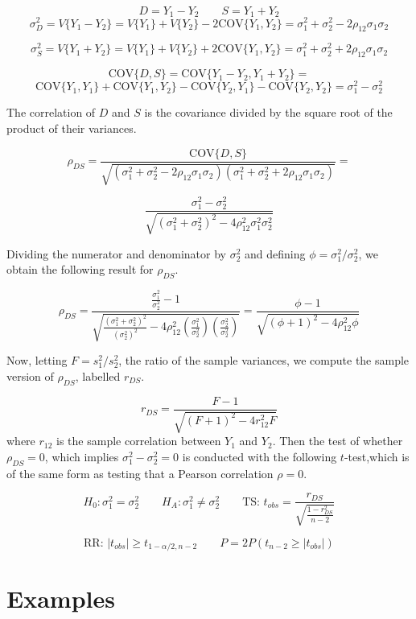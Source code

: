 \documentclass[
]{book}
\begin{document}
\[D=Y_1-Y_2 \qquad  S=Y_1+Y_2\]
\[\sigma_D^2 = V\{Y_1-Y_2\}=V\{Y_1\}+V\{Y_2\}-2\mbox{COV}\{Y_1,Y_2\}=
\sigma_1^2+\sigma_2^2-2\rho_{12}\sigma_1\sigma_2\]

\[\sigma_S^2 = V\{Y_1+Y_2\}=V\{Y_1\}+V\{Y_2\}+2\mbox{COV}\{Y_1,Y_2\}=
\sigma_1^2+\sigma_2^2+2\rho_{12}\sigma_1\sigma_2\]

\[\mbox{COV}\{D,S\}=\mbox{COV}\{Y_1-Y_2,Y_1+Y_2\}=\]
\[\mbox{COV}\{Y_1,Y_1\}+\mbox{COV}\{Y_1,Y_2\}-\mbox{COV}\{Y_2,Y_1\}-
\mbox{COV}\{Y_2,Y_2\}=\sigma_1^2-\sigma_2^2\]

The correlation of \(D\) and \(S\) is the covariance divided by the
square root of the product of their variances.

\[\rho_{DS}=
\frac{\mbox{COV}\{D,S\}}{
\sqrt{\left(\sigma_1^2+\sigma_2^2-2\rho_{12}\sigma_1\sigma_2\right)
\left(\sigma_1^2+\sigma_2^2+2\rho_{12}\sigma_1\sigma_2\right)}}=
\]

\[
\frac{\sigma_1^2-\sigma_2^2}{
\sqrt{\left(\sigma_1^2+\sigma_2^2\right)^2-
4\rho_{12}^2\sigma_1^2\sigma_2^2}}
\]

Dividing the numerator and denominator by \(\sigma_2^2\) and defining
\(\phi=\sigma_1^2/\sigma_2^2\), we obtain the following result for
\(\rho_{DS}\).

\[\rho_{DS}=\frac{\frac{\sigma_1^2}{\sigma_2^2}-1}{
\sqrt{\frac{\left(\sigma_1^2+\sigma_2^2\right)^2}{\left(\sigma_2^2\right)^2}-4\rho_{12}^2\left(\frac{\sigma_1^2}{\sigma_2^2}\right)
\left(\frac{\sigma_2^2}{\sigma_2^2}\right)}}=
\frac{\phi-1}{
\sqrt{(\phi+1)^2-4\rho_{12}^2\phi}
}
\]

Now, letting \(F=s_1^2/s_2^2\), the ratio of the sample variances, we
compute the sample version of \(\rho_{DS}\), labelled \(r_{DS}\).

\[r_{DS}=\frac{F-1}{\sqrt{(F+1)^2-4r_{12}^2F}}\] where \(r_{12}\) is the
sample correlation between \(Y_1\) and \(Y_2\). Then the test of whether
\(\rho_{DS}=0\), which implies \(\sigma_1^2-\sigma_2^2=0\) is conducted
with the following \(t\)-test,which is of the same form as testing that
a Pearson correlation \(\rho=0\).

\[H_0:\sigma_1^2=\sigma_2^2 \qquad H_A:\sigma_1^2 \neq \sigma_2^2 \qquad
\mbox{TS: } t_{obs}=\frac{r_{DS}}{\sqrt{\frac{1-r_{DS}^2}{n-2}}}\]

\[ \mbox{RR: } |t_{obs}|\geq t_{1-\alpha/2,n-2}  \qquad
P=2P\left(t_{n-2}\geq |t_{obs}|\right)  \]

\section{Examples}\label{examples}
\end{document}
